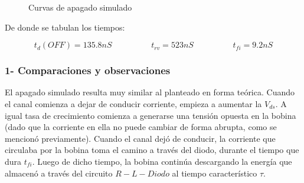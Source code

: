 \documentclass[e4_tp1_main.tex]{subfiles}
\begin{document}
\begin{figure}[H]
\centering
\caption{Curvas de apagado simulado}
\end{figure}

De donde se tabulan los tiempos:

\[
t_d(OFF) = 135.8nS \hspace{2cm} t_{rv} = 523nS \hspace{2cm} t_{fi} = 9.2nS 
\]

\subsubsection*{1- Comparaciones y observaciones}
 
El apagado simulado resulta muy similar al planteado en forma teórica. Cuando el canal comienza a dejar de conducir corriente, empieza a aumentar la $V_{ds}$. A igual tasa de crecimiento comienza a generarse una tensión opuesta en la bobina (dado que la corriente en ella no puede cambiar de forma abrupta, como se mencionó previamente). Cuando el canal dejó de conducir, la corriente que circulaba por la bobina toma el camino a través del diodo, durante el tiempo que dura $t_{fi}$. Luego de dicho tiempo, la bobina continúa descargando la energía que almacenó a través del circuito $R-L-Diodo$ al tiempo característico $\tau$.
 
\newpage
\end{document}

